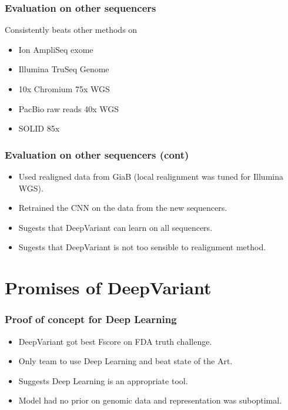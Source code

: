 \documentclass{beamer}
\begin{document}
\begin{frame}
    \frametitle{Evaluation on other sequencers}

    Consistently beats other methods on
    \begin{itemize}
        \item Ion AmpliSeq exome
        \item Illumina TruSeq Genome
        \item 10x Chromium 75x WGS
        \item PacBio raw reads 40x WGS
        \item SOLID 85x
    \end{itemize}
\end{frame}

\begin{frame}
    \frametitle{Evaluation on other sequencers (cont)}

    \begin{itemize}
        \item Used realigned data from GiaB (local realignment was tuned for Illumina WGS).
        \item Retrained the CNN on the data from the new sequencers.
        \item Sugests that DeepVariant can learn on all sequencers.
        \item Sugests that DeepVariant is not too sensible to realignment method.
    \end{itemize}
\end{frame}

\section{Promises of DeepVariant}

\begin{frame}
    \frametitle{Proof of concept for Deep Learning}

    \begin{itemize}
        \item DeepVariant got best Fscore on FDA truth challenge.
        \item Only team to use Deep Learning and beat state of the Art.
        \item Suggests Deep Learning is an appropriate tool.
        \item Model had no prior on genomic data and representation was suboptimal.
    \end{itemize}
\end{frame}
\end{document}
